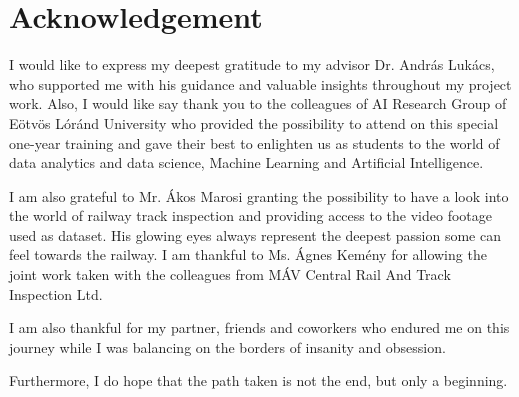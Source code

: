 \section*{Acknowledgement}
I would like to express my deepest gratitude to my advisor Dr. András Lukács,
who supported me with his guidance and valuable insights throughout my project work.
Also, I would like say thank you to the colleagues of AI Research Group of Eötvös Lóránd University
who provided the possibility to attend on this special one-year training and gave their best
to enlighten us as students to the world of data analytics and data science, Machine Learning and
Artificial Intelligence.

I am also grateful to Mr. Ákos Marosi granting the possibility to have a
look into the world of railway track inspection and providing access to the video
footage used as dataset.
His glowing eyes always represent the deepest passion some can feel towards the railway.
I am thankful to Ms. Ágnes Kemény for allowing the joint work taken with the colleagues
from MÁV Central Rail And Track Inspection Ltd.

I am also thankful for my partner, friends and coworkers who endured me on this journey while
I was balancing on the borders of insanity and obsession.

Furthermore, I do hope that the path taken is not the end, but only a beginning.